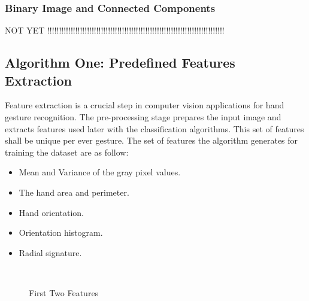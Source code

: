 \documentclass[12pt,fleqn]{book} %
\begin{document}
\subsubsection{Binary Image and Connected Components}
NOT YET !!!!!!!!!!!!!!!!!!!!!!!!!!!!!!!!!!!!!!!!!!!!!!!!!!!!!!!!!!!!!!!!!!!!!!!!!!!!


\subsection{Algorithm One: Predefined Features Extraction}
Feature extraction is a crucial step in computer vision applications for hand gesture recognition. The pre-processing stage prepares the input image and extracts features used later with the classification algorithms. This set of features shall be unique per ever gesture. The set of features the algorithm generates for training the dataset are as follow:
\bigskip
\begin{itemize}
\item Mean and Variance of the gray pixel values.
\item The hand area and perimeter.
\item Hand orientation.
\item Orientation histogram.
\item Radial signature.
\end{itemize}
\bigskip
\begin{figure}[]
\begin{dBox}
\centering
  \mbox{
   }
   \caption{First Two Features \label{fig:mean_area} }   
\end{dBox}   
\end{figure}
\end{document}
